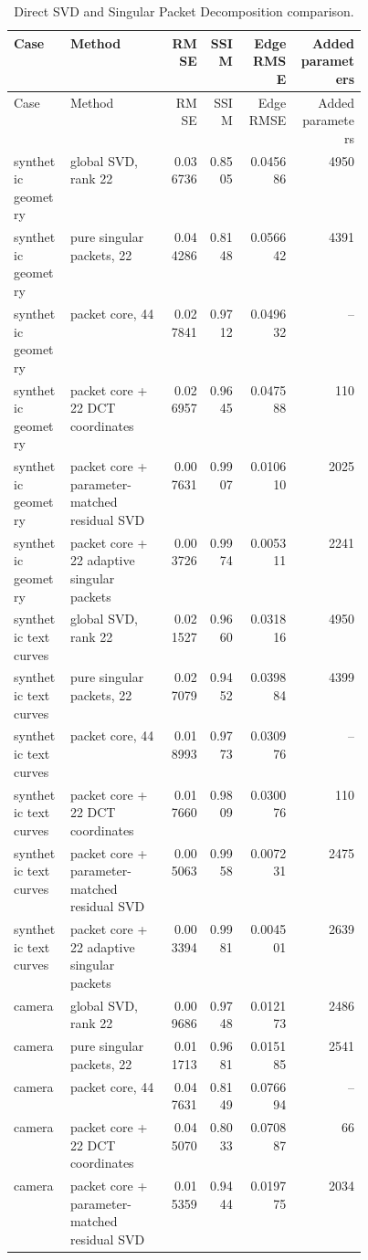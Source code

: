 \scriptsize\setlength{\tabcolsep}{3pt}\begin{longtable}{@{}L{0.16\linewidth}L{0.29\linewidth}rrrr@{}}
\caption{Direct SVD and Singular Packet Decomposition comparison.}\label{tab:svd-spd}\\
\toprule Case & Method & RMSE & SSIM & Edge RMSE & Added parameters\\\midrule
\endfirsthead\toprule Case & Method & RMSE & SSIM & Edge RMSE & Added parameters\\\midrule\endhead
synthetic geometry & global SVD, rank 22 & 0.036736 & 0.8505 & 0.045686 & 4950\\
synthetic geometry & pure singular packets, 22 & 0.044286 & 0.8148 & 0.056642 & 4391\\
synthetic geometry & packet core, 44 & 0.027841 & 0.9712 & 0.049632 & --\\
synthetic geometry & packet core + 22 DCT coordinates & 0.026957 & 0.9645 & 0.047588 & 110\\
synthetic geometry & packet core + parameter-matched residual SVD & 0.007631 & 0.9907 & 0.010610 & 2025\\
synthetic geometry & packet core + 22 adaptive singular packets & 0.003726 & 0.9974 & 0.005311 & 2241\\
synthetic text curves & global SVD, rank 22 & 0.021527 & 0.9660 & 0.031816 & 4950\\
synthetic text curves & pure singular packets, 22 & 0.027079 & 0.9452 & 0.039884 & 4399\\
synthetic text curves & packet core, 44 & 0.018993 & 0.9773 & 0.030976 & --\\
synthetic text curves & packet core + 22 DCT coordinates & 0.017660 & 0.9809 & 0.030076 & 110\\
synthetic text curves & packet core + parameter-matched residual SVD & 0.005063 & 0.9958 & 0.007231 & 2475\\
synthetic text curves & packet core + 22 adaptive singular packets & 0.003394 & 0.9981 & 0.004501 & 2639\\
camera & global SVD, rank 22 & 0.009686 & 0.9748 & 0.012173 & 2486\\
camera & pure singular packets, 22 & 0.011713 & 0.9681 & 0.015185 & 2541\\
camera & packet core, 44 & 0.047631 & 0.8149 & 0.076694 & --\\
camera & packet core + 22 DCT coordinates & 0.045070 & 0.8033 & 0.070887 & 66\\
camera & packet core + parameter-matched residual SVD & 0.015359 & 0.9444 & 0.019775 & 2034\\

\end{longtable}
